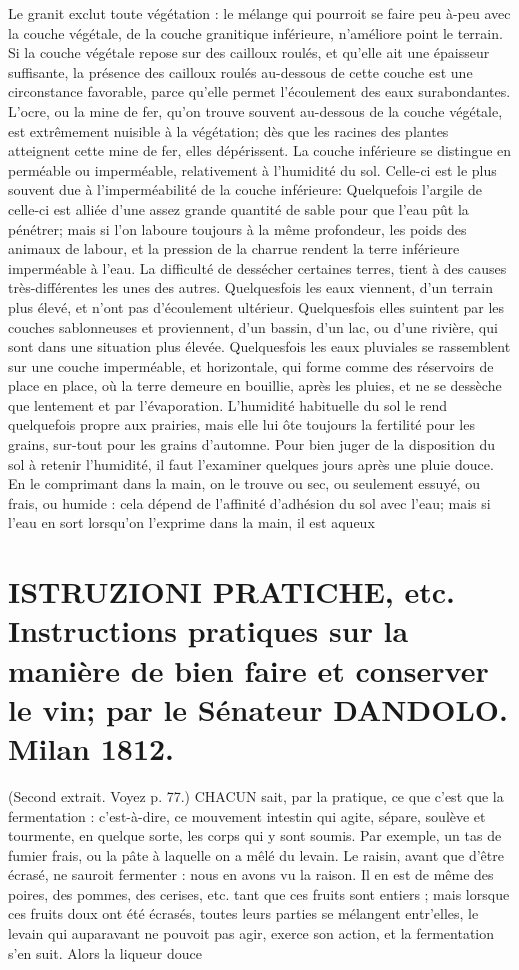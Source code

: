 Le granit exclut toute végétation : le mélange qui pourroit se faire peu à-peu avec la couche végétale, de la couche granitique inférieure, n'améliore point le terrain.
Si la couche végétale repose sur des cailloux roulés, et qu'elle ait une épaisseur suffisante, la présence des cailloux roulés au-dessous de cette couche est une circonstance favorable, parce qu'elle permet l'écoulement des eaux surabondantes.
L'ocre, ou la mine de fer, qu'on trouve souvent au-dessous de la couche végétale, est extrêmement nuisible à la végétation; dès que les racines des plantes atteignent cette mine de fer, elles dépérissent.
La couche inférieure se distingue en perméable ou imperméable, relativement à l'humidité du sol. Celle-ci est le plus souvent due à l'imperméabilité de la couche inférieure: Quelquefois l'argile de celle-ci est alliée d'une assez grande quantité de sable pour que l'eau pût la pénétrer; mais si l'on laboure toujours à la même profondeur, les poids des animaux de labour, et la pression\setcounter{page}{136} de la charrue rendent la terre inférieure imperméable à l'eau.
La difficulté de dessécher certaines terres, tient à des causes très-différentes les unes des autres. Quelquesfois les eaux viennent, d'un terrain plus élevé, et n'ont pas d'écoulement ultérieur. Quelquesfois elles suintent par les couches sablonneuses et proviennent, d'un bassin, d'un lac, ou d'une rivière, qui sont dans une situation plus élevée. Quelquesfois les eaux pluviales se rassemblent sur une couche imperméable, et horizontale, qui forme comme des réservoirs de place en place, où la terre demeure en bouillie, après les pluies, et ne se dessèche que lentement et par l'évaporation.
L'humidité habituelle du sol le rend quelquefois propre aux prairies, mais elle lui ôte toujours la fertilité pour les grains, sur-tout pour les grains d'automne.
Pour bien juger de la disposition du sol à retenir l'humidité, il faut l'examiner quelques jours après une pluie douce. En le comprimant dans la main, on le trouve ou sec, ou seulement essuyé, ou frais, ou humide : cela dépend de l'affinité d'adhésion du sol avec l'eau; mais si l'eau en sort lorsqu'on l'exprime dans la main, il est aqueux\setcounter{page}{137} \section{ISTRUZIONI PRATICHE, etc. Instructions pratiques sur la manière de bien faire et conserver le vin; par le Sénateur DANDOLO. Milan 1812.}
(Second extrait. Voyez p. 77.)
CHACUN sait, par la pratique, ce que c'est que la fermentation : c'est-à-dire, ce mouvement intestin qui agite, sépare, soulève et tourmente, en quelque sorte, les corps qui y sont soumis. Par exemple, un tas de fumier frais, ou la pâte à laquelle on a mêlé du levain.
Le raisin, avant que d'être écrasé, ne sauroit fermenter : nous en avons vu la raison. Il en est de même des poires, des pommes, des cerises, etc. tant que ces fruits sont entiers ; mais lorsque ces fruits doux ont été écrasés, toutes leurs parties se mélangent entr'elles, le levain qui auparavant ne pouvoit pas agir, exerce son action, et la fermentation s'en suit. Alors la liqueur douce